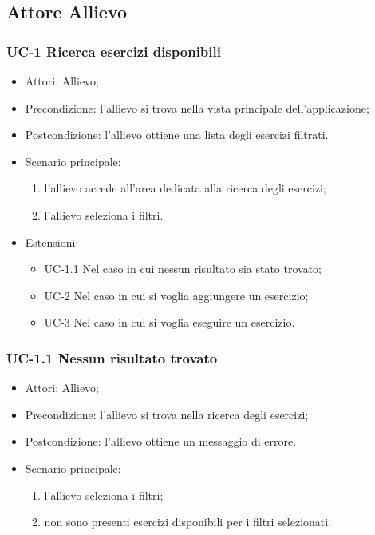 \subsection{Attore Allievo}
	\subsubsection{UC-1 Ricerca esercizi disponibili}
		\begin{itemize}
			\item Attori: Allievo;
			\item Precondizione: l'allievo si trova nella vista principale dell'applicazione;
			\item Postcondizione: l'allievo ottiene una lista degli esercizi filtrati.
			\item Scenario principale:
				\begin{enumerate}
					\item l'allievo accede all'area dedicata alla ricerca degli esercizi;
					\item l'allievo seleziona i filtri.
				\end{enumerate}
			\item Estensioni:
				\begin{itemize}
					\item UC-1.1 Nel caso in cui nessun risultato sia stato trovato;
					\item UC-2 Nel caso in cui si voglia aggiungere un esercizio;
					\item UC-3 Nel caso in cui si voglia eseguire un esercizio.
				\end{itemize}
		\end{itemize}
	\subsubsection{UC-1.1 Nessun risultato trovato}
		\begin{itemize}
			\item Attori: Allievo;
			\item Precondizione: l'allievo si trova nella ricerca degli esercizi;
			\item Postcondizione: l'allievo ottiene un messaggio di errore.
			\item Scenario principale:
				\begin{enumerate}
					\item l'allievo seleziona i filtri;
					\item non sono presenti esercizi disponibili per i filtri selezionati.
				\end{enumerate}
		\end{itemize}

